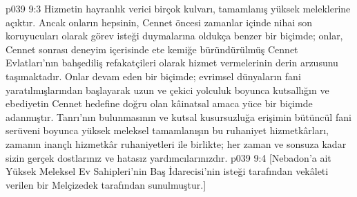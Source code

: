 \vs p039 9:3 Hizmetin hayranlık verici birçok kulvarı, tamamlanış yüksek meleklerine açıktır. Ancak onların hepsinin, Cennet öncesi zamanlar içinde nihai son koruyucuları olarak görev isteği duymalarına oldukça benzer bir biçimde; onlar, Cennet sonrası deneyim içerisinde ete kemiğe büründürülmüş Cennet Evlatları’nın bahşediliş refakatçileri olarak hizmet vermelerinin derin arzusunu taşımaktadır. Onlar devam eden bir biçimde; evrimsel dünyaların fani yaratılmışlarından başlayarak uzun ve çekici yolculuk boyunca kutsallığın ve ebediyetin Cennet hedefine doğru olan kâinatsal amaca yüce bir biçimde adanmıştır. Tanrı’nın bulunmasının ve kutsal kusursuzluğa erişimin bütüncül fani serüveni boyunca yüksek meleksel tamamlanışın bu ruhaniyet hizmetkârları, zamanın inançlı hizmetkâr ruhaniyetleri ile birlikte; her zaman ve sonsuza kadar sizin gerçek dostlarınız ve hatasız yardımcılarınızdır.
\vs p039 9:4 [Nebadon’a ait Yüksek Meleksel Ev Sahipleri’nin Baş İdarecisi’nin isteği tarafından vekâleti verilen bir Melçizedek tarafından sunulmuştur.]

